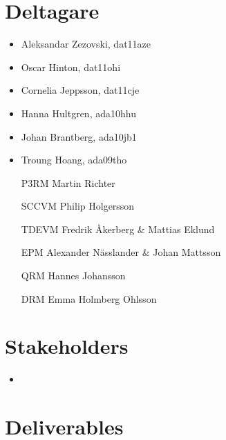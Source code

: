 \documentclass[a4paper]{article}
\begin{document}
	\section{Deltagare} %
	\label{sec:deltagare}
		\begin{itemize}
			\item Aleksandar Zezovski, dat11aze
			\item Oscar Hinton, dat11ohi
			\item Cornelia Jeppsson, dat11cje
			\item Hanna Hultgren, ada10hhu
			\item Johan Brantberg, ada10jb1
			\item Troung Hoang, ada09tho
		\end{itemize}
		
		\begin{itemize}
			\item[P3RM]	Martin Richter 
			\item[SCCVM]	Philip Holgersson
			\item[TDEVM]	Fredrik Åkerberg \& Mattias Eklund
			\item[EPM]	Alexander Nässlander \& Johan Mattsson
			\item[QRM]	Hannes Johansson
			\item[DRM]	Emma Holmberg Ohlsson
		\end{itemize}
		

	\section{Stakeholders} %
	\label{sec:stakeholders}
		\begin{itemize}
			\item 
		\end{itemize}

	\section{Deliverables} %
	\label{sec:deliverables}
		

	
\end{document}
